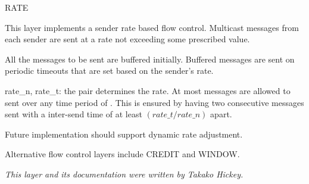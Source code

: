 \begin{Layer}{RATE}

This layer implements a sender rate based flow control.  Multicast messages
from each sender are sent at a rate not exceeding some prescribed value.

\begin{Protocol}
All the messages to be sent are buffered initially.  Buffered messages are
sent on periodic timeouts that are set based on the sender's rate.
\end{Protocol}

\begin{Parameters}
\item
rate\_n, rate\_t: the pair determines the rate.  At most 
messages are allowed to sent over any time period of .  This
is ensured by having two consecutive messages sent with a inter-send time
of at least $(rate\_t / rate\_n)$ apart.
\end{Parameters}


\begin{Notes}
\item Future implementation should support dynamic rate adjustment.
\item Alternative flow control layers include CREDIT and WINDOW.
\end{Notes}

\begin{Sources}
\end{Sources}

\emph{This layer and its documentation were written by Takako Hickey.}
\end{Layer}
